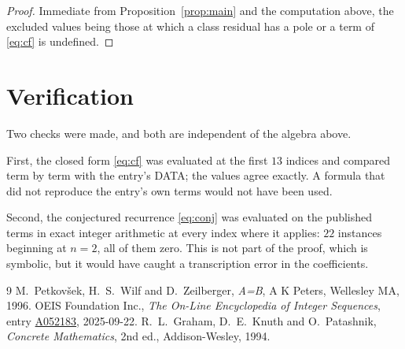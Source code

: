 \documentclass[11pt,a4paper]{article}
\theoremstyle{plain}
\theoremstyle{definition}
\begin{document}
\begin{proof}
Immediate from Proposition~\ref{prop:main} and the computation above, the excluded values
being those at which a class residual has a pole or a term of \eqref{eq:cf} is undefined.
\end{proof}

\section{Verification}

Two checks were made, and both are independent of the algebra above.

First, the closed form \eqref{eq:cf} was evaluated at the first $13$ indices and
compared term by term with the entry's DATA; the values agree exactly. A formula that did
not reproduce the entry's own terms would not have been used.

Second, the conjectured recurrence \eqref{eq:conj} was evaluated on the published terms in
exact integer arithmetic at every index where it applies: $22$ instances beginning at
$n=2$, all of them zero. This is not part of the proof, which is symbolic, but it
would have caught a transcription error in the coefficients.

\begin{thebibliography}{9}
 M.~Petkov\v{s}ek, H.~S.~Wilf and D.~Zeilberger, \emph{A=B}, A K Peters,
Wellesley MA, 1996.
 OEIS Foundation Inc., \emph{The On-Line Encyclopedia of Integer Sequences},
entry \href{https://oeis.org/A052183}{A052183}, 2025-09-22.
 R.~L.~Graham, D.~E.~Knuth and O.~Patashnik, \emph{Concrete Mathematics},
2nd ed., Addison-Wesley, 1994.
\end{thebibliography}
\end{document}
